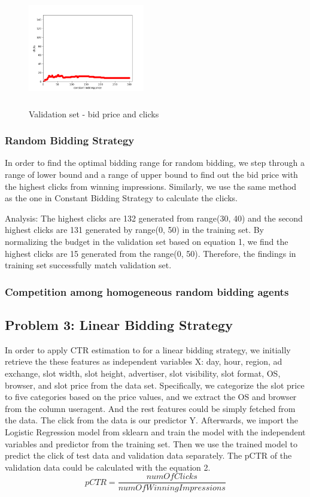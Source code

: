 \documentclass{sig-alternate-05-2015}
\begin{document}
\begin{figure}
\centering
\includegraphics[height=2in, width=2in]{images/constant_bidding_validation.png}
\caption{Validation set - bid price and clicks}
\end{figure}




\subsubsection{Random Bidding Strategy}
In order to find the optimal bidding range for random bidding, we step through a range of lower bound and a range of upper bound to find out the bid price with the highest clicks from winning impressions. Similarly, we use the same method as the one in Constant Bidding Strategy to calculate the clicks. 

Analysis: 
The highest clicks are 132 generated from range(30, 40) and the second highest clicks are 131 generated by range(0, 50) in the training set. By normalizing the budget in the validation set based on equation 1, we find the highest clicks are 15 generated from the range(0, 50). Therefore, the findings in training set successfully match validation set. 

\subsubsection{Competition among homogeneous random bidding agents}

\subsection{Problem 3: Linear Bidding Strategy}
In order to apply CTR estimation to for a linear bidding strategy, we initially retrieve the these features as independent variables X: day, hour, region, ad exchange, slot width, slot height, advertiser, slot visibility, slot format, OS, browser, and slot price from the data set. Specifically, we categorize the slot price to five categories based on the price values, and we extract the OS and browser from the column useragent. And the rest features could be simply fetched from the data. The click from the data is our predictor Y.
Afterwards, we import the Logistic Regression model from sklearn and train the model with the independent variables and predictor from the training set. Then we use the trained model to predict the click of test data and validation data separately. The pCTR of the validation data could be calculated with the equation 2.
\begin{equation}pCTR=\frac{numOfClicks}{numOfWinningImpressions}\end{equation}
\end{document}
